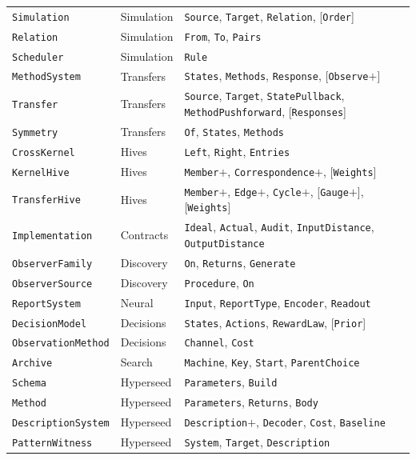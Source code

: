 \documentclass[11pt]{article}
\newcommand{\code}[1]{\texttt{#1}}
\theoremstyle{definition}
\theoremstyle{plain}
\begin{document}
{\begin{longtable}{>{\raggedright\arraybackslash}p{3.0cm}>{\raggedright\arraybackslash}p{2.0cm}>{\raggedright\arraybackslash}p{9.0cm}}
\code{Simulation} & Simulation & \code{Source}, \code{Target}, \code{Relation}, [\code{Order}]\\
\code{Relation} & Simulation & \code{From}, \code{To}, \code{Pairs}\\
\code{Scheduler} & Simulation & \code{Rule}\\
\code{MethodSystem} & Transfers & \code{States}, \code{Methods}, \code{Response}, [\code{Observe}$+$]\\
\code{Transfer} & Transfers & \code{Source}, \code{Target}, \code{StatePullback}, \code{MethodPushforward}, [\code{Responses}]\\
\code{Symmetry} & Transfers & \code{Of}, \code{States}, \code{Methods}\\
\code{CrossKernel} & Hives & \code{Left}, \code{Right}, \code{Entries}\\
\code{KernelHive} & Hives & \code{Member}$+$, \code{Correspondence}$+$, [\code{Weights}]\\
\code{TransferHive} & Hives & \code{Member}$+$, \code{Edge}$+$, \code{Cycle}$+$, [\code{Gauge}$+$], [\code{Weights}]\\
\code{Implementation} & Contracts & \code{Ideal}, \code{Actual}, \code{Audit}, \code{InputDistance}, \code{OutputDistance}\\
\code{ObserverFamily} & Discovery & \code{On}, \code{Returns}, \code{Generate}\\
\code{ObserverSource} & Discovery & \code{Procedure}, \code{On}\\
\code{ReportSystem} & Neural & \code{Input}, \code{ReportType}, \code{Encoder}, \code{Readout}\\
\code{DecisionModel} & Decisions & \code{States}, \code{Actions}, \code{RewardLaw}, [\code{Prior}]\\
\code{ObservationMethod} & Decisions & \code{Channel}, \code{Cost}\\
\code{Archive} & Search & \code{Machine}, \code{Key}, \code{Start}, \code{ParentChoice}\\
\code{Schema} & Hyperseed & \code{Parameters}, \code{Build}\\
\code{Method} & Hyperseed & \code{Parameters}, \code{Returns}, \code{Body}\\
\code{DescriptionSystem} & Hyperseed & \code{Description}$+$, \code{Decoder}, \code{Cost}, \code{Baseline}\\
\code{PatternWitness} & Hyperseed & \code{System}, \code{Target}, \code{Description}\\
\bottomrule\end{longtable}}
\end{document}
